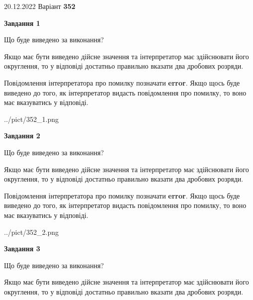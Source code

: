 \documentclass[12pt, ukrainian]{article}
\begin{document}
{20.12.2022 Варіант \No \textbf { 352 }\par}
{
\begin {Large}

{\begin {center}\textbf{Завдання 1}\end {center}}\par
Що буде виведено за виконання? \par

Якщо має бути виведено дійсне значення та інтерпретатор має здійснювати його округлення, 
то у відповіді достатньо правильно вказати два дробових розряди.

Повідомлення інтерпретатора про помилку позначати \textbf{error}.
Якщо щось буде виведено до того, як інтерпретатор видасть повідомлення про помилку, 
то воно має вказуватись у відповіді. \par

\begin{center}
	{../pict/352_1.png}
\end{center}
\newpage

{\begin {center}\textbf{Завдання 2}\end {center}}\par
Що буде виведено за виконання? \par

Якщо має бути виведено дійсне значення та інтерпретатор має здійснювати його округлення, 
то у відповіді достатньо правильно вказати два дробових розряди.

Повідомлення інтерпретатора про помилку позначати \textbf{error}.
Якщо щось буде виведено до того, як інтерпретатор видасть повідомлення про помилку, 
то воно має вказуватись у відповіді. \par

\begin{center}
	{../pict/352_2.png}
\end{center}
\newpage

{\begin {center}\textbf{Завдання 3}\end {center}}\par
Що буде виведено за виконання? \par

Якщо має бути виведено дійсне значення та інтерпретатор має здійснювати його округлення, 
то у відповіді достатньо правильно вказати два дробових розряди.


\end{Large}}
\end{document}
